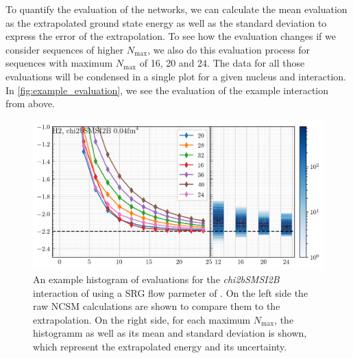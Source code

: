 To quantify the evaluation of the networks, we can calculate the mean evaluation as the extrapolated ground state energy as well as the standard deviation to express the error of the extrapolation. To see how the evaluation changes if we consider sequences of higher $N_\mathrm{max}$, we also do this evaluation process for sequences with maximum $N_\mathrm{max}$ of 16, 20 and 24. The data for all those evaluations will be condensed in a single plot for a given nucleus and interaction. In \autoref{fig:example_evaluation}, we see the evaluation of the example interaction from above.

\begin{figure}[H]
  \centering
  \includegraphics[]{media/example_evaluation.png}
  \caption{An example histogram of evaluations for the \textit{chi2bSMSI2B} interaction of  using a SRG flow parmeter of . On the left side the raw NCSM calculations are shown to compare them to the extrapolation. On the right side, for each maximum $N_\mathrm{max}$, the histogramm as well as its mean and standard deviation is shown, which represent the extrapolated energy and its uncertainty.}
  \label{fig:example_evaluation}
\end{figure}
